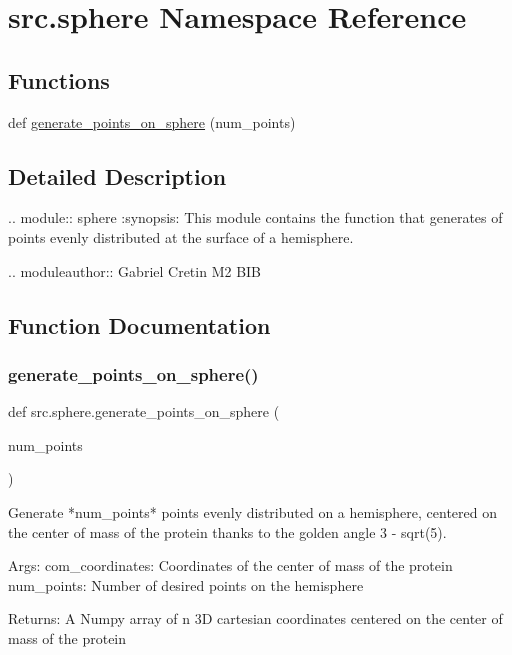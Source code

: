\hypertarget{namespacesrc_1_1sphere}{}\section{src.\+sphere Namespace Reference}
\label{namespacesrc_1_1sphere}
\subsection*{Functions}
\begin{DoxyCompactItemize}
\item 
def \hyperlink{namespacesrc_1_1sphere_a615d86272d2868fff225fe6c5354c129}{generate\+\_\+points\+\_\+on\+\_\+sphere} (num\+\_\+points)
\end{DoxyCompactItemize}


\subsection{Detailed Description}
\begin{DoxyVerb}.. module:: sphere
   :synopsis: This module contains the function that generates of points
   evenly distributed at the surface of a hemisphere.

.. moduleauthor:: Gabriel Cretin M2 BIB
\end{DoxyVerb}
 

\subsection{Function Documentation}
\mbox{\label{namespacesrc_1_1sphere_a615d86272d2868fff225fe6c5354c129}} 
\subsubsection{\texorpdfstring{generate\+\_\+points\+\_\+on\+\_\+sphere()}{generate\_points\_on\_sphere()}}
{\footnotesize\ttfamily def src.\+sphere.\+generate\+\_\+points\+\_\+on\+\_\+sphere (\begin{DoxyParamCaption}\item[{}]{num\+\_\+points }\end{DoxyParamCaption})}

\begin{DoxyVerb}Generate *num_points* points evenly distributed on a hemisphere,
centered on the center of mass of the protein thanks to the
golden angle 3 - sqrt(5).

Args:
    com_coordinates: Coordinates of the center of mass of the protein
    num_points: Number of desired points on the hemisphere

Returns:
    A Numpy array of n 3D cartesian coordinates
    centered on the center of mass of the protein
\end{DoxyVerb}
 